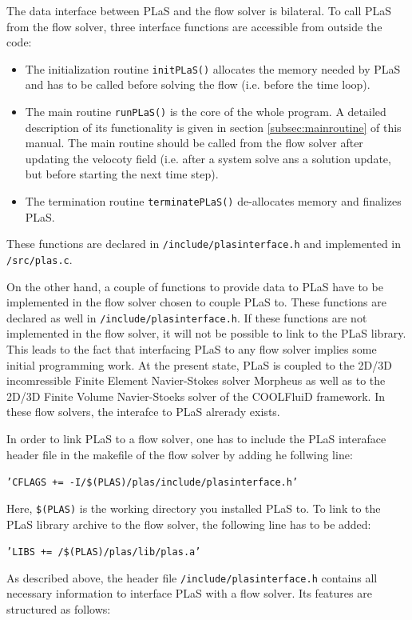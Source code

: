 \documentclass[12pt]{article}
\begin{document}
The data interface between PLaS and the flow solver is bilateral. To call PLaS from the flow solver, three interface functions are accessible from outside the code:

\begin{itemize}
\item The initialization routine {\tt{initPLaS()}} allocates the memory needed by PLaS and has to be called before solving the flow (i.e. before the time loop).
\item The main routine {\tt{runPLaS()}} is the core of the whole program. A detailed description of its functionality is given in section \ref{subsec:mainroutine} of this manual. The main routine should be called from the flow solver after updating the velocoty field (i.e. after a system solve ans a solution update, but before starting the next time step).
\item The termination routine {\tt{terminatePLaS()}} de-allocates memory and finalizes PLaS.
\end{itemize}

These functions are declared in {\tt{/include/plasinterface.h}} and implemented in {\tt{/src/plas.c}}.

On the other hand, a couple of functions to provide data to PLaS have to be implemented in the flow solver chosen to couple PLaS to. These functions are declared as well in {\tt{/include/plasinterface.h}}. If these functions are not implemented in the flow solver, it will not be possible to link to the PLaS library. This leads to the fact that interfacing PLaS to any flow solver implies some initial programming work. At the present state, PLaS is coupled to the 2D/3D incomressible Finite Element Navier-Stokes solver Morpheus as well as to the 2D/3D Finite Volume Navier-Stoeks solver of the COOLFluiD framework. In these flow solvers, the interafce to PLaS alrerady exists.

In order to link PLaS to a flow solver, one has to include the PLaS interaface header file in the makefile of the flow solver by adding he follwing line:

{\tt{'CFLAGS += -I/\$(PLAS)/plas/include/plasinterface.h'}}

Here, {\tt{\$(PLAS)}} is the working directory you installed PLaS to. To link to the PLaS library archive to the flow solver, the following line has to be added:

{\tt{'LIBS += /\$(PLAS)/plas/lib/plas.a'}}

As described above, the header file {\tt{/include/plasinterface.h}} contains all necessary information to interface PLaS with a flow solver. Its features are structured as follows:
\end{document}
